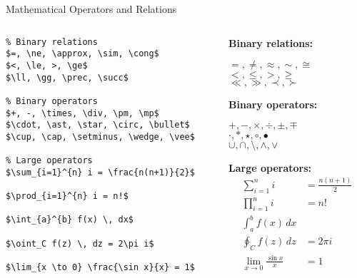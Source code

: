 \begin{frame}[fragile]{Mathematical Operators and Relations}
    \begin{columns}
        \begin{column}{0.5\textwidth}
\begin{lstlisting}
% Binary relations
$=, \ne, \approx, \sim, \cong$
$<, \le, >, \ge$
$\ll, \gg, \prec, \succ$

% Binary operators
$+, -, \times, \div, \pm, \mp$
$\cdot, \ast, \star, \circ, \bullet$
$\cup, \cap, \setminus, \wedge, \vee$

% Large operators
$\sum_{i=1}^{n} i = \frac{n(n+1)}{2}$

$\prod_{i=1}^{n} i = n!$

$\int_{a}^{b} f(x) \, dx$

$\oint_C f(z) \, dz = 2\pi i$

$\lim_{x \to 0} \frac{\sin x}{x} = 1$
\end{lstlisting}
        \end{column}
        
        \begin{column}{0.5\textwidth}
            \textbf{Binary relations:}
            \begin{center}
                $=, \ne, \approx, \sim, \cong$\\
                $<, \le, >, \ge$\\
                $\ll, \gg, \prec, \succ$
            \end{center}
            
            \textbf{Binary operators:}
            \begin{center}
                $+, -, \times, \div, \pm, \mp$\\
                $\cdot, \ast, \star, \circ, \bullet$\\
                $\cup, \cap, \setminus, \wedge, \vee$
            \end{center}
            
            \textbf{Large operators:}
            \begin{align*}
                \sum_{i=1}^{n} i &= \frac{n(n+1)}{2}\\
                \prod_{i=1}^{n} i &= n!\\
                \int_{a}^{b} f(x) \, dx\\
                \oint_C f(z) \, dz &= 2\pi i\\
                \lim_{x \to 0} \frac{\sin x}{x} &= 1
            \end{align*}
        \end{column}
    \end{columns}
\end{frame}

